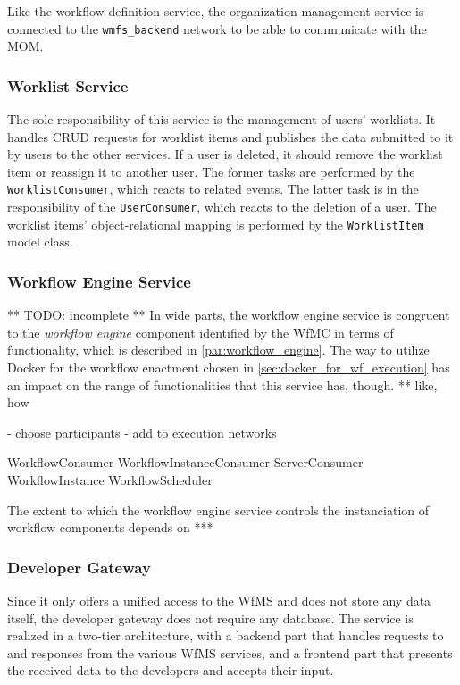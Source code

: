     Like the workflow definition service, the organization management service is connected to the \texttt{wmfs\_backend} network to be able to communicate with the \ac{MOM}.

  \subsubsection{Worklist Service} %
    \label{subs:worklist_service}
    The sole responsibility of this service is the management of users' worklists. It handles \ac{CRUD} requests for worklist items and publishes the data submitted to it by users to the other services. If a user is deleted, it should remove the worklist item or reassign it to another user. The former tasks are performed by the \texttt{WorklistConsumer}, which reacts to related events. The latter task is in the responsibility of the \texttt{UserConsumer}, which reacts to the deletion of a user. The worklist items' object-relational mapping is performed by the \texttt{WorklistItem} model class.

  \subsubsection{Workflow Engine Service} %
    \label{subs:workflow_engine_service}
    ** TODO: incomplete **
    In wide parts, the workflow engine service is congruent to the \emph{workflow engine} component identified by the \ac{WfMC} in terms of functionality, which is described in \ref{par:workflow_engine}. The way to utilize Docker for the workflow enactment chosen in \ref{sec:docker_for_wf_execution} has an impact on the range of functionalities that this service has, though. ** like, how

    - choose participants
    - add to execution networks

    WorkflowConsumer
    WorkflowInstanceConsumer
    ServerConsumer
    WorkflowInstance
    WorkflowScheduler


    The extent to which the workflow engine service controls the instanciation of workflow components depends on ***

  \subsubsection{Developer Gateway} %
    \label{subs:developer_gateway}
    Since it only offers a unified access to the \ac{WfMS} and does not store any data itself, the developer gateway does not require any database. The service is realized in a two-tier architecture, with a backend part that handles requests to and responses from the various \ac{WfMS} services, and a frontend part that presents the received data to the developers and accepts their input.


